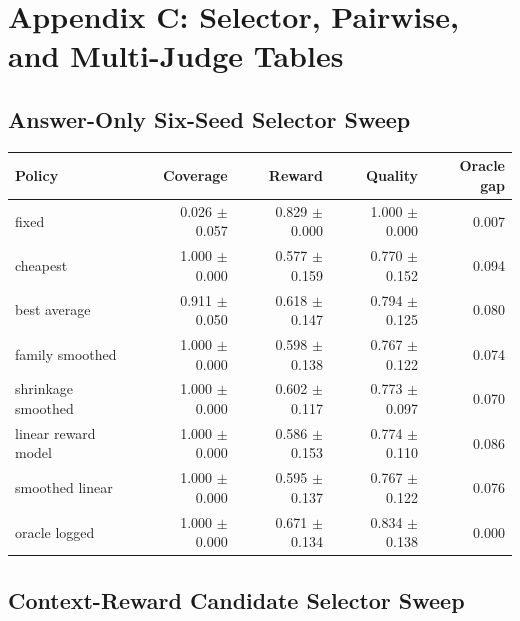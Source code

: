\section{Appendix C: Selector, Pairwise, and Multi-Judge Tables}

\subsection{Answer-Only Six-Seed Selector Sweep}

\begin{longtable}{l r r r r}
\toprule
Policy & Coverage & Reward & Quality & Oracle gap \\
\midrule
fixed & 0.026 $\pm$ 0.057 & 0.829 $\pm$ 0.000 & 1.000 $\pm$ 0.000 & 0.007 \\
cheapest & 1.000 $\pm$ 0.000 & 0.577 $\pm$ 0.159 & 0.770 $\pm$ 0.152 & 0.094 \\
best average & 0.911 $\pm$ 0.050 & 0.618 $\pm$ 0.147 & 0.794 $\pm$ 0.125 & 0.080 \\
family smoothed & 1.000 $\pm$ 0.000 & 0.598 $\pm$ 0.138 & 0.767 $\pm$ 0.122 & 0.074 \\
shrinkage smoothed & 1.000 $\pm$ 0.000 & 0.602 $\pm$ 0.117 & 0.773 $\pm$ 0.097 & 0.070 \\
linear reward model & 1.000 $\pm$ 0.000 & 0.586 $\pm$ 0.153 & 0.774 $\pm$ 0.110 & 0.086 \\
smoothed linear & 1.000 $\pm$ 0.000 & 0.595 $\pm$ 0.137 & 0.767 $\pm$ 0.122 & 0.076 \\
oracle logged & 1.000 $\pm$ 0.000 & 0.671 $\pm$ 0.134 & 0.834 $\pm$ 0.138 & 0.000 \\
\bottomrule
\end{longtable}

\subsection{Context-Reward Candidate Selector Sweep}

